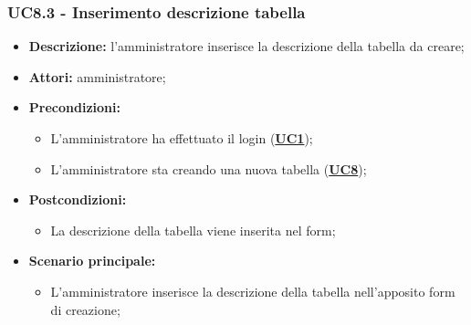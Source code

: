 \subsubsection{UC8.3 - Inserimento descrizione tabella}
\label{sec:UC8.3}
\begin{itemize}
	\item \textbf{Descrizione:} l’amministratore inserisce la descrizione della tabella da creare;
	\item \textbf{Attori:} amministratore;
	\item \textbf{Precondizioni:} 
	\begin{itemize}
		\item L’amministratore ha effettuato il login (\hyperref[sec:UC1]{\textbf{UC1}});
		\item L’amministratore sta creando una nuova tabella (\hyperref[sec:UC1]{\textbf{UC8}});
	\end{itemize}
	\item \textbf{Postcondizioni:} 
	\begin{itemize}
		\item La descrizione della tabella viene inserita nel form;
	\end{itemize}
	\item \textbf{Scenario principale:} 
	\begin{itemize}
		\item L’amministratore inserisce la descrizione della tabella nell'apposito form di creazione;
	\end{itemize}
\end{itemize}

